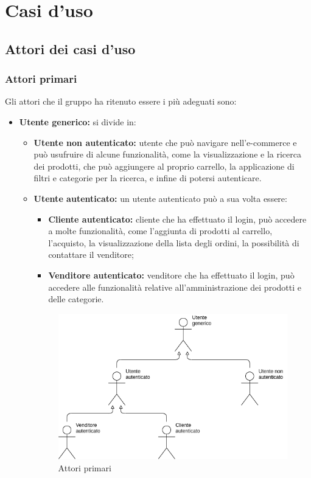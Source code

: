 \section{Casi d'uso}
    \subsection{Attori dei casi d'uso}
    \subsubsection{Attori primari}
    Gli attori che il gruppo ha ritenuto essere i più adeguati sono:
        \begin{itemize}
            \item \textbf{Utente generico:} si divide in:
                \begin{itemize}
                    \item \textbf{Utente non autenticato:} utente che può navigare nell'e-commerce e può usufruire di alcune funzionalità, come la visualizzazione e la ricerca dei prodotti, che può aggiungere al proprio carrello, la applicazione di filtri e categorie per la ricerca, e infine di potersi autenticare.
                    \item \textbf{Utente autenticato:} un utente autenticato può a sua volta essere:
                        \begin{itemize}
                            \item \textbf{Cliente autenticato:} cliente che ha effettuato il login, può accedere a molte funzionalità, come l'aggiunta di prodotti al carrello, l'acquisto, la visualizzazione della lista degli ordini, la possibilità di contattare il venditore;
                            \item \textbf{Venditore autenticato:} venditore che ha effettuato il login, può accedere alle funzionalità relative all'amministrazione dei prodotti e delle categorie.
                        \end{itemize}
                        \begin{figure}[!ht]
                            \caption{Attori primari}
                            \vspace{5px}
                            \includegraphics[scale=0.59]{../../../Images/attori}

\end{figure}
\end{itemize}
\end{itemize}
